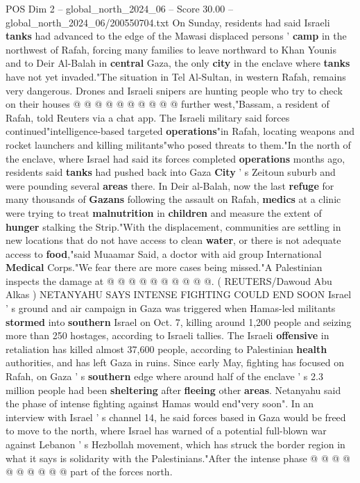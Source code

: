 \begin{textsample}{POS Dim 2 – global\_north\_2024\_06 – Score 30.00 – global\_north\_2024\_06/200550704.txt}
On Sunday, residents had said Israeli \textbf{tanks} had advanced to the edge of the Mawasi displaced persons ' \textbf{camp} in the northwest of Rafah, forcing many families to leave northward to Khan Younis and to Deir Al-Balah in \textbf{central} Gaza, the only \textbf{city} in the enclave where \textbf{tanks} have not yet invaded."The situation in Tel Al-Sultan, in western Rafah, remains very dangerous.
Drones and Israeli snipers are hunting people who try to check on their houses @ @ @ @ @ @ @ @ @ @ further west,"Bassam, a resident of Rafah, told Reuters via a chat app.
The Israeli military said forces continued"intelligence-based targeted \textbf{operations}"in Rafah, locating weapons and rocket launchers and killing militants"who posed threats to them."In the north of the enclave, where Israel had said its forces completed \textbf{operations} months ago, residents said \textbf{tanks} had pushed back into Gaza \textbf{City} ' s Zeitoun suburb and were pounding several \textbf{areas} there.
In Deir al-Balah, now the last \textbf{refuge} for many thousands of \textbf{Gazans} following the assault on Rafah, \textbf{medics} at a clinic were trying to treat \textbf{malnutrition} in \textbf{children} and measure the extent of \textbf{hunger} stalking the Strip."With the displacement, communities are settling in new locations that do not have access to clean \textbf{water}, or there is not adequate access to \textbf{food},"said Muaamar Said, a doctor with aid group International \textbf{Medical} Corps."We fear there are more cases being missed."A Palestinian inspects the damage at @ @ @ @ @ @ @ @ @ @. ( REUTERS/Dawoud Abu Alkas ) NETANYAHU SAYS INTENSE FIGHTING COULD END SOON Israel ' s ground and air campaign in Gaza was triggered when Hamas-led militants \textbf{stormed} into \textbf{southern} Israel on Oct. 7, killing around 1,200 people and seizing more than 250 hostages, according to Israeli tallies.
The Israeli \textbf{offensive} in retaliation has killed almost 37,600 people, according to Palestinian \textbf{health} authorities, and has left Gaza in ruins.
Since early May, fighting has focused on Rafah, on Gaza ' s \textbf{southern} edge where around half of the enclave ' s 2.3 million people had been \textbf{sheltering} after \textbf{fleeing} other \textbf{areas}.
Netanyahu said the phase of intense fighting against Hamas would end"very soon".
In an interview with Israel ' s channel 14, he said forces based in Gaza would be freed to move to the north, where Israel has warned of a potential full-blown war against Lebanon ' s Hezbollah movement, which has struck the border region in what it says is solidarity with the Palestinians."After the intense phase @ @ @ @ @ @ @ @ @ @ part of the forces north.

\end{textsample}
